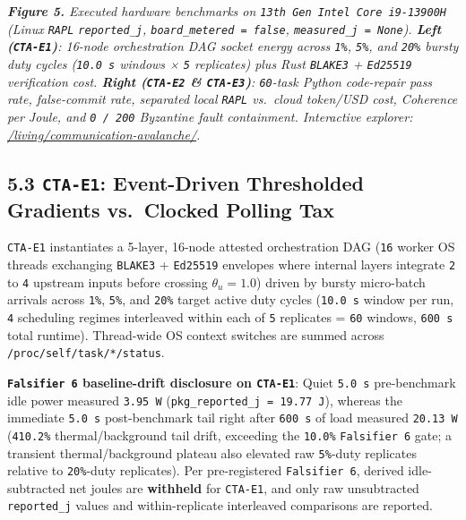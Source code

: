 \documentclass[10pt,letterpaper]{article}
\begin{document}
\emph{\textbf{Figure 5.} Executed hardware benchmarks on
\texttt{13th\ Gen\ Intel\ Core\ i9-\allowbreak{}13900H} (Linux \texttt{RAPL}
\texttt{reported\_\allowbreak{}j}, \texttt{board\_\allowbreak{}metered\ =\ false},
\texttt{measured\_\allowbreak{}j\ =\ None}). \textbf{Left (\texttt{CTA-E1})}: 16-node
orchestration DAG socket energy across \texttt{1\%}, \texttt{5\%}, and
\texttt{20\%} bursty duty cycles (\texttt{10.0\ s} windows × \texttt{5}
replicates) plus Rust \texttt{BLAKE3} + \texttt{Ed25519} verification
cost. \textbf{Right (\texttt{CTA-E2} \& \texttt{CTA-E3})}:
\texttt{60}-task Python code-repair pass rate, false-commit rate,
separated local \texttt{RAPL} vs.~cloud token/USD cost, Coherence per
Joule, and \texttt{0\ /\ 200} Byzantine fault containment. Interactive
explorer:
\href{https://research.openie.dev/living/communication-avalanche/}{/living/communication-avalanche/}.}

\subsection{\texorpdfstring{5.3 \texttt{CTA-E1}: Event-Driven
Thresholded Gradients vs.~Clocked Polling
Tax}{5.3 CTA-E1: Event-Driven Thresholded Gradients vs.~Clocked Polling Tax}}\label{cta-e1-event-driven-thresholded-gradients-vs.-clocked-polling-tax}

\texttt{CTA-E1} instantiates a 5-layer, 16-node attested orchestration
DAG (\texttt{16} worker OS threads exchanging \texttt{BLAKE3} +
\texttt{Ed25519} envelopes where internal layers integrate \texttt{2} to
\texttt{4} upstream inputs before crossing \(\theta_u = 1.0\)) driven by
bursty micro-batch arrivals across \texttt{1\%}, \texttt{5\%}, and
\texttt{20\%} target active duty cycles (\texttt{10.0\ s} window per
run, \texttt{4} scheduling regimes interleaved within each of \texttt{5}
replicates = \texttt{60} windows, \texttt{600\ s} total runtime).
Thread-wide OS context switches are summed across
\texttt{/\allowbreak{}proc/\allowbreak{}self/\allowbreak{}task/\allowbreak{}*/\allowbreak{}status}.

\textbf{\texttt{Falsifier\ 6} baseline-drift disclosure on
\texttt{CTA-E1}}: Quiet \texttt{5.0\ s} pre-benchmark idle power
measured \texttt{3.95\ W} (\texttt{pkg\_\allowbreak{}reported\_\allowbreak{}j\ =\ 19.\allowbreak{}77\ J}),
whereas the immediate \texttt{5.0\ s} post-benchmark tail right after
\texttt{600\ s} of load measured \texttt{20.13\ W} (\texttt{410.2\%}
thermal/background tail drift, exceeding the \texttt{10.0\%}
\texttt{Falsifier\ 6} gate; a transient thermal/background plateau also
elevated raw \texttt{5\%}-duty replicates relative to \texttt{20\%}-duty
replicates). Per pre-registered \texttt{Falsifier\ 6}, derived
idle-subtracted net joules are \textbf{withheld} for \texttt{CTA-E1},
and only raw unsubtracted \texttt{reported\_\allowbreak{}j} values and
within-replicate interleaved comparisons are reported.
\end{document}
